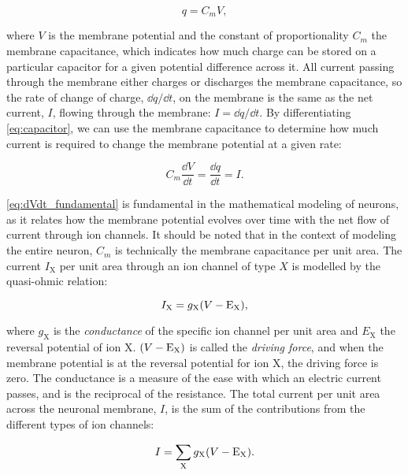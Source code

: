 \begin{equation}\label{eq:capacitor}
    q = C_m V,
\end{equation}

where $V$ is the membrane potential and the constant of proportionality $C_m$ the membrane capacitance, which indicates how much charge can be stored on a particular capacitor for a given potential difference across it. All current passing through the membrane either charges or discharges the membrane capacitance, so the rate of change of charge, $\dd{q}/\dd{t}$, on the membrane is the same as the net current, $I$, flowing through the membrane: $I=\dd{q}/\dd{t}$. By differentiating \autoref{eq:capacitor}, we can use the membrane capacitance to determine how much current is required to change the membrane potential at a given rate: 

\begin{equation}\label{eq:dVdt_fundamental}
   C_m \frac{\dd{V}}{\dd{t}} = \frac{\dd{q}}{\dd{t}} = I.
\end{equation} 

\autoref{eq:dVdt_fundamental} is fundamental in the mathematical modeling of neurons, as it relates how the membrane potential evolves over time with the net flow of current through ion channels. It should be noted that in the context of modeling the entire neuron, $C_m$ is technically the membrane capacitance per unit area. The current $I_\mathrm{X}$ per unit area through an ion channel of type $X$ is modelled by the quasi-ohmic relation: 

\begin{equation}
    I_\mathrm{X} = g_\mathrm{X} \qty(V - \mathrm{E_X}),
\end{equation}

where $g_\mathrm{X}$ is the \textit{conductance} of the specific ion channel per unit area and $E_\mathrm{X}$ the reversal potential of ion $\mathrm{X}$. $\qty(V - \mathrm{E_X})$ is called the \textit{driving force}, and when the membrane potential is at the reversal potential for ion $\mathrm{X}$, the driving force is zero. The conductance is a measure of the ease with which an electric current passes, and is the reciprocal of the resistance. The total current per unit area across the neuronal membrane, $I$, is the sum of the contributions from the different types of ion channels:

\begin{equation}
    I = \sum_\mathrm{X} g_\mathrm{X} \qty(V - \mathrm{E_X}).
\end{equation}


